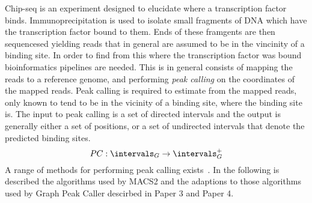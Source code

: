 Chip-seq is an experiment designed to elucidate where a transcription factor binds. Immunoprecipitation is used to isolate small fragments of DNA which have the transcription factor bound to them.
Ends of these framgents are then sequencesed yielding reads that in general are assumed to be in the vincinity of a binding site. In order to find from this where the transcription factor was bound bioinformatics pipelines are needed.
This is in general consists of mapping the reads to a reference genome, and performing \emph{peak calling} on the coordinates of the mapped reads.
Peak calling is required to estimate from the mapped reads,
only known to tend to be in the vicinity of a binding site, where the binding site is.
The input to peak calling is a set of directed intervals and the output is generally either a set of positions, or a set of undirected intervals that denote the predicted binding sites. 
\[PC: \intervals_G \rightarrow \intervals^+_G\] 
A range of methods for performing peak calling exists~\cite{macs2, SPP, peakcallreview}.
In the following is described the algorithms used by MACS2 and the adaptions to those algorithms used by Graph Peak Caller descirbed in Paper 3 and Paper 4.

